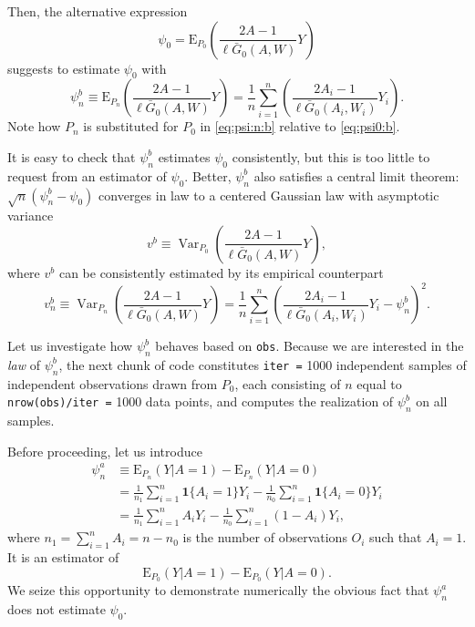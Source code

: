 \documentclass[]{article}
\DeclareMathOperator{\Var}{Var}
\newcommand{\Exp}{\textrm{E}}
\newcommand{\Gbar}{\bar{G}}
\newcommand{\one}{\textbf{1}}
\theoremstyle{definition}
\theoremstyle{definition}
\theoremstyle{definition}
\theoremstyle{remark}
\begin{document}
Then, the alternative expression
\begin{equation}\label{eq:psi0:b} \psi_{0} =
\Exp_{P_{0}}    \left(\frac{2A-1}{\ell\Gbar_{0}(A,W)}Y\right)   \end{equation}
suggests to estimate \(\psi_{0}\) with
\begin{equation}\label{eq:psi:n:b}\psi_{n}^{b}       \equiv       \Exp_{P_{n}}
\left(\frac{2A-1}{\ell\Gbar_{0}(A,W)}Y\right)  =   \frac{1}{n}  \sum_{i=1}^{n}
\left(\frac{2A_{i}-1}{\ell\Gbar_{0}(A_{i},W_{i})}Y_{i}\right).\end{equation}
Note how \(P_{n}\) is substituted for \(P_{0}\) in \eqref{eq:psi:n:b}
relative to \eqref{eq:psi0:b}.

It is easy to check that \(\psi_{n}^{b}\) estimates \(\psi_{0}\)
consistently, but this is too little to request from an estimator of
\(\psi_{0}\). Better, \(\psi_{n}^{b}\) also satisfies a central limit
theorem: \(\sqrt{n} (\psi_{n}^{b} - \psi_{0})\) converges in law to a
centered Gaussian law with asymptotic variance
\begin{equation*}v^{b}     \equiv     \Var_{P_{0}}
\left(\frac{2A-1}{\ell\Gbar_{0}(A,W)}Y\right),\end{equation*} where
\(v^{b}\) can be consistently estimated by its empirical counterpart
\begin{equation}\label{eq:v:n:b}      v_{n}^{b}       \equiv      \Var_{P_{n}}
\left(\frac{2A-1}{\ell\Gbar_{0}(A,W)}Y\right)  =   \frac{1}{n}  \sum_{i=1}^{n}
\left(\frac{2A_{i}-1}{\ell\Gbar_{0}(A_{i},W_{i})}Y_{i}                       -
\psi_{n}^{b}\right)^{2}.\end{equation}

Let us investigate how \(\psi_{n}^{b}\) behaves based on \texttt{obs}.
Because we are interested in the \textit{law} of \(\psi_{n}^{b}\), the
next chunk of code constitutes \texttt{iter\ =} 1000 independent samples
of independent observations drawn from \(P_{0}\), each consisting of
\(n\) equal to \texttt{nrow(obs)/iter\ =} 1000 data points, and computes
the realization of \(\psi_{n}^{b}\) on all samples.

Before proceeding, let us introduce \begin{align*}\psi_{n}^{a}  &\equiv
\Exp_{P_{n}} \left(Y  | A=1\right) -  \Exp_{P_{n}} \left(Y | A=0\right)  \\ &=
\frac{1}{n_{1}}   \sum_{i=1}^{n}  \one\{A_{i}=1\}   Y_{i}  -   \frac{1}{n_{0}}
\sum_{i=1}^{n} \one\{A_{i}=0\} Y_{i}  \\&=\frac{1}{n_{1}} \sum_{i=1}^{n} A_{i}
Y_{i} - \frac{1}{n_{0}}  \sum_{i=1}^{n} (1 - A_{i})  Y_{i}, \end{align*}
where \(n_{1} = \sum_{i=1}^{n} A_{i} = n - n_{0}\) is the number of
observations \(O_{i}\) such that \(A_{i} = 1\). It is an estimator of
\begin{equation*}\Exp_{P_{0}}    (Y   |    A=1)    -    \Exp_{P_{0}}   (Y    |
A=0).\end{equation*} We seize this opportunity to demonstrate
numerically the obvious fact that \(\psi_{n}^{a}\) does not estimate
\(\psi_{0}\).
\end{document}
